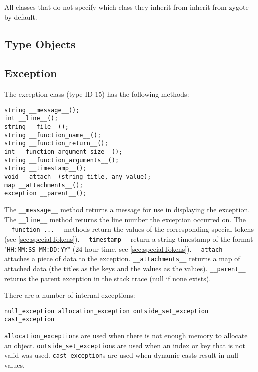 \documentclass[10pt,a4paper]{article}
\begin{document}
All classes that do not specify which class they inherit from inherit from zygote by default.

\subsection{Type Objects}
\label{sec:typeObjects}


\subsection{Exception}
\label{sec:exceptions}
The exception class (type ID 15) has the following methods:
\begin{verbatim}
string __message__();
int __line__();
string __file__();
string __function_name__();
string __function_return__();
int __function_argument_size__();
string __function_arguments__();
string __timestamp__();
void __attach__(string title, any value);
map __attachments__();
exception __parent__();
\end{verbatim}

The \verb|__message__| method returns a message for use in displaying the exception. The \verb|__line__| method returns the line number the exception occurred on. The \verb|__function_...__| methods return the values of the corresponding special tokens (see \ref{sec:specialTokens}). \verb|__timestamp__| return a string timestamp of the format "\verb|HH:MM:SS MM:DD:YY|" (24-hour time, see \ref{sec:specialTokens}). \verb|__attach__| attaches a piece of data to the exception. \verb|__attachments__| returns a map of attached data (the titles as the keys and the values as the values). \verb|__parent__| returns the parent exception in the stack trace (null if none exists).

There are a number of internal exceptions:
\begin{verbatim}
null_exception allocation_exception outside_set_exception
cast_exception
\end{verbatim}

\verb|allocation_exception|s are used when there is not enough memory to allocate an object. \verb|outside_set_exception|s are used when an index or key that is not valid was used. \verb|cast_exception|s are used when dynamic casts result in null values.
\end{document}
